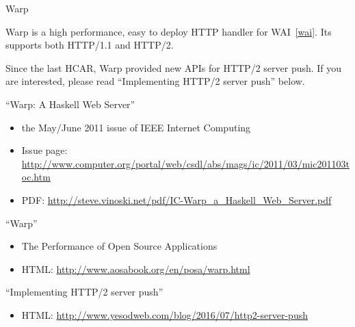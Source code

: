 \begin{hcarentry}{Warp}
\label{warp}
\makeheader

Warp is a high performance, easy to deploy HTTP handler for WAI~\cref{wai}.
Its supports both HTTP/1.1 and HTTP/2.

Since the last HCAR, Warp provided new APIs for HTTP/2 server push.
If you are interested, please read ``Implementing HTTP/2 server push'' below.

\FurtherReading
\begin{compactitem}
\item``Warp: A Haskell Web Server''
  \begin{itemize}
  \item the May/June 2011 issue of IEEE Internet Computing
  \item Issue page: \url{http://www.computer.org/portal/web/csdl/abs/mags/ic/2011/03/mic201103toc.htm}
  \item  PDF: \url{http://steve.vinoski.net/pdf/IC-Warp\_a\_Haskell\_Web\_Server.pdf}
  \end{itemize}
\item ``Warp''
  \begin{itemize}
  \item The Performance of Open Source Applications
  \item HTML: \url{http://www.aosabook.org/en/posa/warp.html}
  \end{itemize}
\item ``Implementing HTTP/2 server push''
  \begin{itemize}
  \item HTML: \url{http://www.yesodweb.com/blog/2016/07/http2-server-push}
  \end{itemize}
\end{compactitem}
\end{hcarentry}
